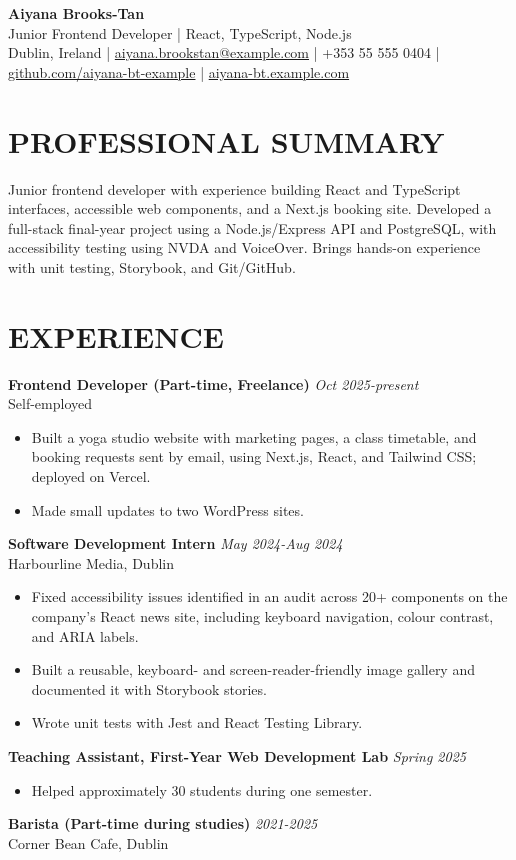 \documentclass[11pt,a4paper]{article}
\begin{document}
\begin{center}
{\Huge\bfseries\color{primarycolor} Aiyana Brooks-Tan}\\[0.3em]
{\large Junior Frontend Developer | React, TypeScript, Node.js}\\[0.3em]
Dublin, Ireland | \href{mailto:aiyana.brookstan@example.com}{aiyana.brookstan@example.com} | +353 55 555 0404 | \href{https://github.com/aiyana-bt-example}{github.com/aiyana-bt-example} | \href{https://aiyana-bt.example.com}{aiyana-bt.example.com}
\end{center}
\section*{PROFESSIONAL SUMMARY}
Junior frontend developer with experience building React and TypeScript interfaces, accessible web components, and a Next.js booking site. Developed a full-stack final-year project using a Node.js/Express API and PostgreSQL, with accessibility testing using NVDA and VoiceOver. Brings hands-on experience with unit testing, Storybook, and Git/GitHub.
\section*{EXPERIENCE}
\textbf{Frontend Developer (Part-time, Freelance)} \hfill \textit{Oct 2025-present}\\
Self-employed
\begin{itemize}
\item Built a yoga studio website with marketing pages, a class timetable, and booking requests sent by email, using Next.js, React, and Tailwind CSS; deployed on Vercel.
\item Made small updates to two WordPress sites.
\end{itemize}
\textbf{Software Development Intern} \hfill \textit{May 2024-Aug 2024}\\
Harbourline Media, Dublin
\begin{itemize}
\item Fixed accessibility issues identified in an audit across 20+ components on the company's React news site, including keyboard navigation, colour contrast, and ARIA labels.
\item Built a reusable, keyboard- and screen-reader-friendly image gallery and documented it with Storybook stories.
\item Wrote unit tests with Jest and React Testing Library.
\end{itemize}
\textbf{Teaching Assistant, First-Year Web Development Lab} \hfill \textit{Spring 2025}
\begin{itemize}
\item Helped approximately 30 students during one semester.
\end{itemize}
\textbf{Barista (Part-time during studies)} \hfill \textit{2021-2025}\\
Corner Bean Cafe, Dublin
\end{document}
